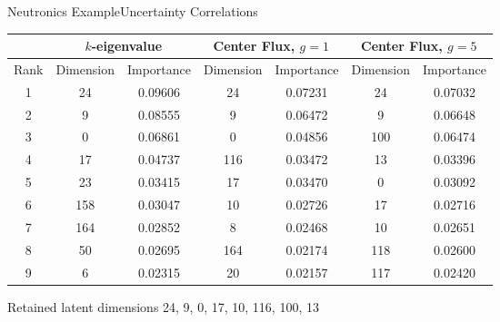 \documentclass{beamer}
\begin{document}
\begin{frame}{Neutronics Example}{Uncertainty Correlations}\vspace{-20pt}
\begin{table}
\tiny
  \centering \hspace{-20pt}
  \begin{tabular}{|c|c c|c c|c c|} \hline
    & \multicolumn{2}{|c|}{$k$-eigenvalue} & \multicolumn{2}{|c|}{Center Flux, $g=1$} &
             \multicolumn{2}{|c|}{Center Flux, $g=5$} \\ \hline
    Rank & Dimension & Importance & Dimension & Importance & Dimension & Importance \\ \hline
    1 &  24 & 0.09606 &  24 & 0.07231 &  24 &  0.07032  \\
    2 &   9 & 0.08555 &   9 & 0.06472 &   9 &  0.06648  \\
    3 &   0 & 0.06861 &   0 & 0.04856 & 100 &  0.06474  \\
    4 &  17 & 0.04737 & 116 & 0.03472 &  13 &  0.03396  \\ \cline{2-3}
    5 &  23 & 0.03415 &  17 & 0.03470 &   0 &  0.03092  \\ 
    6 & 158 & 0.03047 &  10 & 0.02726 &  17 &  0.02716  \\ \cline{4-5}
    7 & 164 & 0.02852 &   8 & 0.02468 &  10 &  0.02651  \\ \cline{6-7}
    8 &  50 & 0.02695 & 164 & 0.02174 & 118 &  0.02600  \\
    9 &   6 & 0.02315 &  20 & 0.02157 & 117 &  0.02420  \\
  \hline \end{tabular}
\end{table}
Retained latent dimensions 24, 9, 0, 17, 10, 116, 100, 13
\end{frame}
\end{document}
